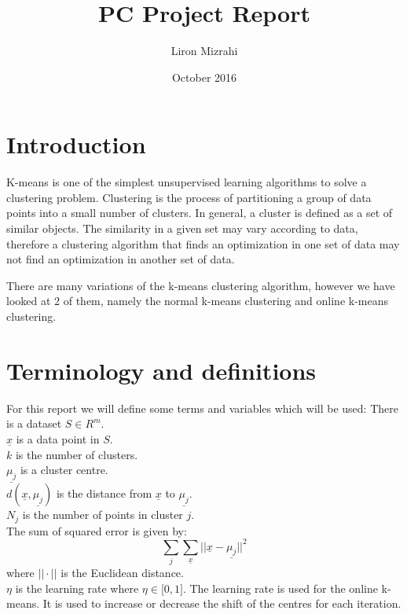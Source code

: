 \documentclass{article}
\title{PC Project Report}
\author{Liron Mizrahi}
\date{October 2016}
\begin{document}
\maketitle

\section{Introduction}
K-means is  one of the simplest unsupervised learning algorithms to solve a clustering problem. Clustering is the process of partitioning a group of data points into a small number of clusters. In general, a cluster is defined as a set of similar objects. The similarity in a given set may vary according to data, therefore a clustering algorithm that finds an optimization in one set of data may not find an optimization in another set of data.

There are many variations of the k-means clustering algorithm, however we have looked at 2 of them, namely the normal k-means clustering and online k-means clustering.

\section{Terminology and definitions}
For this report we will define some terms and variables which will be used:
There is a dataset $S \in R^m$.\\
$\underline{x}$ is a data point in $S$.\\
$k$ is the number of clusters.\\
$\underline{\mu_j}$ is a cluster centre.\\
$d(\underline{x}, \underline{\mu_j})$ is the distance from $\underline{x}$ to $\underline{\mu_j}$.\\
$N_j$ is the number of points in cluster $j$.\\
The sum of squared error is given by:
    $$\sum_{j}\sum_{\underline{x}} || \underline{x} - \underline{\mu_j} ||^2 $$
where $||\cdot||$ is the Euclidean distance.\\
$\eta$ is the learning rate where $\eta \in \big[0, 1\big]$. The learning rate is used for the online k-means. It is used to increase or decrease the shift of the centres for each iteration.
\end{document}
